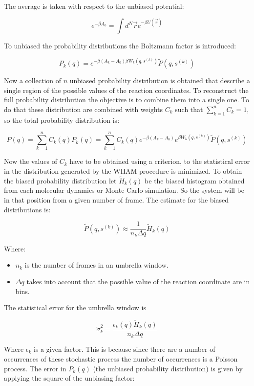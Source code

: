 	The average is taken with respect to the unbiased potential:

	$$e^{-\beta A_0} = \int d^N\vec{r}e^{-\beta U(\vec{r})}$$

	To unbiased the probability distributions the Boltzmann factor is introduced:

	$$P_k(q) = e^{-\beta(A_k-A_0)\beta W_k(q, s^{(k)})}\tilde{P}(q, s^{(k)})$$

	Now a collection of $n$ unbiased probability distribution is obtained that describe a single region of the possible values of the reaction coordinates.
	To reconstruct the full probability distribution the objective is to combine them into a single one.
	To do that these distribution are combined with weights $C_k$ such that $\sum\limits_{k=1}^n C_k=1$, so the total probability distribution is:

	$$P(q) = \sum\limits_{k=1}^n C_k(q)P_k(q) = \sum\limits_{k=1}^nC_k(q)e^{-\beta(A_k-A_0)}e^{\beta W_k(q, s^{(k)})}\tilde{P}(q, s^{(k)})$$

	Now the values of $C_k$ have to be obtained using a criterion, to the statistical error in the distribution generated by the WHAM procedure is minimized.
	To obtain the biased probability distribution let $\tilde{H}_k(q)$ be the biased histogram obtained from each molecular dynamics or Monte Carlo simulation.
	So the system will be in that position from a given number of frame.
	The estimate for the biased distributions is:

	$$\tilde{P}(q, s^{(k)}) \approx\frac{1}{n_k\Delta q}\tilde{H}_k(q)$$

	Where:

	\begin{multicols}{2}
		\begin{itemize}
			\item $n_k$ is the number of frames in an umbrella window.
			\item $\Delta q$ takes into account that the possible value of the reaction coordinate are in bins.
		\end{itemize}
	\end{multicols}

	The statistical error for the umbrella window is

	$$\tilde{\sigma}^2_k = \frac{\epsilon_k(q)\tilde{H}_k(q)}{n_k\Delta q}$$

	Where $\epsilon_k$ is a given factor.
	This is because since there are a number of occurrences of these stochastic process the number of occurrences is a Poisson process.
	The error in $P_k(q)$ (the unbiased probability distribution) is given by applying the square of the unbiasing  factor:


